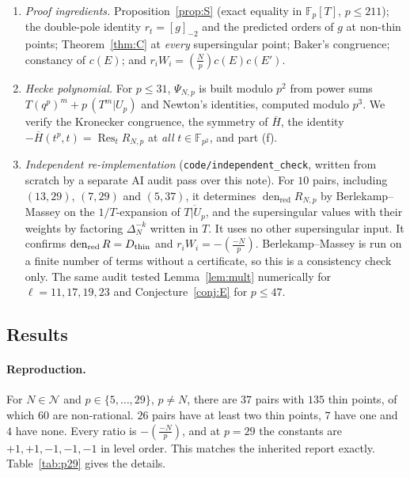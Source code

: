 \documentclass[11pt,a4paper]{article}
\numberwithin{equation}{section}
\theoremstyle{definition}
\theoremstyle{remark}
\newcommand{\Fp}{\mathbb F_p}
\newcommand{\Fq}{\mathbb F_{p^2}}
\newcommand{\Res}{\operatorname{Res}}
\newcommand{\den}{\operatorname{den}_{\mathrm{red}}}
\newcommand{\Lp}[1]{\left(\frac{#1}{p}\right)}
\begin{document}
\begin{enumerate}[label=(\arabic*)]
proven Kaneko--Zagier lemma, not on the conjecture. Tier 2 agrees with Tier 1 wherever both were run.
\item \emph{Proof ingredients.} Proposition~\ref{prop:S} (exact equality in $\Fp[T]$, $p\le 211$);
the double-pole identity $r_t=[g]_{-2}$ and the predicted orders of $g$ at non-thin points;
Theorem~\ref{thm:C} at \emph{every} supersingular point; Baker's congruence; constancy of $c(E)$;
and $r_iW_i=\Lp Nc(E)c(E')$.
\item \emph{Hecke polynomial.} For $p\le31$, $\Psi_{N,p}$ is built modulo $p^2$ from power sums
$T(q^p)^m+p\,(T^m|U_p)$ and Newton's identities, computed modulo $p^3$. We verify the Kronecker
congruence, the symmetry of $\overline H$, the identity $-\overline H(t^p,t)=\Res_tR_{N,p}$ at
\emph{all} $t\in\Fq$, and part (f).
\item \emph{Independent re-implementation} (\texttt{code/independent\_check}, written from scratch by a separate
AI audit pass over this note). For $10$ pairs, including $(13,29)$, $(7,29)$ and $(5,37)$, it determines
$\den R_{N,p}$ by Berlekamp--Massey on the $1/T$-expansion of $\overline{T|U_p}$, and the supersingular values with
their weights by factoring $\Delta_N^{-k}$ written in $T$. It uses no other supersingular input. It confirms
$\den R=D_{\rm thin}$ and $r_iW_i=-\Lp{-N}$. Berlekamp--Massey is run on a finite number of terms without a
certificate, so this is a consistency check only. The same audit tested Lemma~\ref{lem:mult} numerically for
$\ell=11,17,19,23$ and Conjecture~\ref{conj:E} for $p\le47$.
\end{enumerate}

\subsection{Results}
\paragraph{Reproduction.} For $N\in\mathcal N$ and $p\in\{5,\dots,29\}$, $p\ne N$, there are $37$
pairs with $135$ thin points, of which $60$ are non-rational. $26$ pairs have at least two thin
points, $7$ have one and $4$ have none. Every ratio is $-\Lp{-N}$, and at $p=29$ the constants are
$+1,+1,-1,-1,-1$ in level order. This matches the inherited report exactly. Table~\ref{tab:p29}
gives the details.
\end{document}
